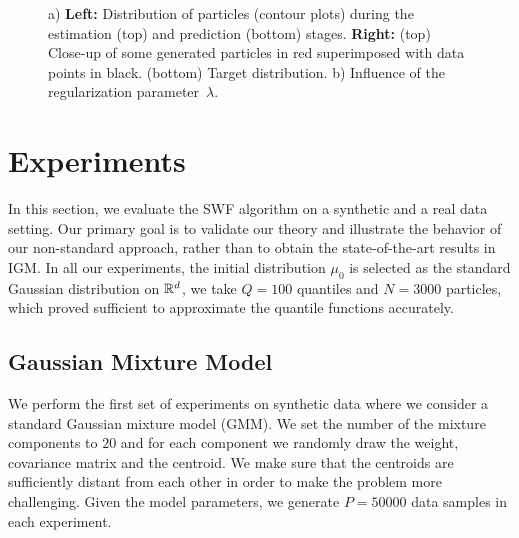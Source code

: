 
\begin{figure*}
 \hspace{30pt}
\caption{a) \textbf{Left:} Distribution of particles (contour plots) during the estimation (top) and prediction (bottom) stages. \textbf{Right:} (top) Close-up of some generated particles in red superimposed with data points in black. (bottom) Target distribution. b) Influence of the regularization parameter~$\lambda$. }
\label{fig:gmm1}
\end{figure*}

\section{Experiments}


%
In this section, we evaluate the SWF algorithm on a synthetic and a real data setting. Our primary goal is to validate our theory and illustrate the behavior of our non-standard approach, rather than to obtain the state-of-the-art results in IGM. In all our experiments, the initial distribution $\mu_0$ is selected as the standard Gaussian distribution on $\mathbb{R}^d$, we take $Q=100$ quantiles and $N=3000$ particles, which proved sufficient to approximate the quantile functions accurately. %



\subsection{Gaussian Mixture Model }
We perform the first set of experiments on synthetic data where we consider a standard Gaussian mixture model (GMM).
%
We set the number of the mixture components to $20$ and for each component we randomly draw the weight, covariance matrix and the centroid. We make sure that the centroids are sufficiently distant from each other in order to make the problem more challenging. Given the model parameters, we generate $P=50000$ data samples in each experiment.


